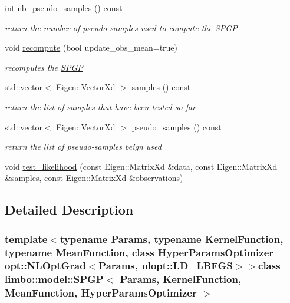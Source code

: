 \begin{DoxyCompactItemize}
int \hyperlink{classlimbo_1_1model_1_1_s_p_g_p_a43c26bf3d36965be388aa4814cf144c5}{nb\+\_\+pseudo\+\_\+samples} () const 
\begin{DoxyCompactList}\small\item\em return the number of pseudo samples used to compute the \hyperlink{classlimbo_1_1model_1_1_s_p_g_p}{S\+P\+G\+P} \end{DoxyCompactList}\item 
void \hyperlink{classlimbo_1_1model_1_1_s_p_g_p_a7443e10b67b9e4934572401ef099a517}{recompute} (bool update\+\_\+obs\+\_\+mean=true)
\begin{DoxyCompactList}\small\item\em recomputes the \hyperlink{classlimbo_1_1model_1_1_s_p_g_p}{S\+P\+G\+P} \end{DoxyCompactList}\item 
std\+::vector$<$ Eigen\+::\+Vector\+Xd $>$ \hyperlink{classlimbo_1_1model_1_1_s_p_g_p_a867505eb41e8fe971eb7de28b2cea50f}{samples} () const 
\begin{DoxyCompactList}\small\item\em return the list of samples that have been tested so far \end{DoxyCompactList}\item 
std\+::vector$<$ Eigen\+::\+Vector\+Xd $>$ \hyperlink{classlimbo_1_1model_1_1_s_p_g_p_aa5b380d8bd02f7a4a7a759038469b20b}{pseudo\+\_\+samples} () const 
\begin{DoxyCompactList}\small\item\em return the list of pseudo-\/samples beign used \end{DoxyCompactList}\item 
void \hyperlink{classlimbo_1_1model_1_1_s_p_g_p_a0f36e61908b422052019819cb8c8e57d}{test\+\_\+likelihood} (const Eigen\+::\+Matrix\+Xd \&data, const Eigen\+::\+Matrix\+Xd \&\hyperlink{classlimbo_1_1model_1_1_s_p_g_p_a867505eb41e8fe971eb7de28b2cea50f}{samples}, const Eigen\+::\+Matrix\+Xd \&observations)
\end{DoxyCompactItemize}


\subsection{Detailed Description}
\subsubsection*{template$<$typename Params, typename Kernel\+Function, typename Mean\+Function, class Hyper\+Params\+Optimizer = opt\+::\+N\+L\+Opt\+Grad$<$\+Params, nlopt\+::\+L\+D\+\_\+\+L\+B\+F\+G\+S$>$$>$class limbo\+::model\+::\+S\+P\+G\+P$<$ Params, Kernel\+Function, Mean\+Function, Hyper\+Params\+Optimizer $>$}

